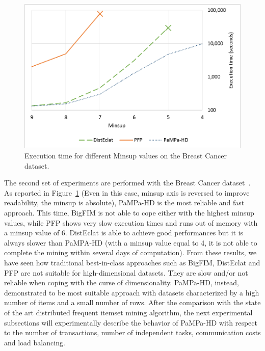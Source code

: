 \begin{figure}[!t]
\includegraphics[width=5in]{immagini_extension/breast_confronto.png}
\caption{Execution time for different Minsup values on the Breast Cancer dataset.}
\label{breast_confronto}
\end{figure}
The second set of experiments are performed with the Breast
Cancer dataset~\cite{breast_cancer_dataset}.
As reported in Figure~\ref{breast_confronto} (Even in this case, minsup axis is reversed to improve readability, the minsup is absolute), PaMPa-HD is the most reliable and fast approach.
This time, BigFIM is not able to cope either with the highest minsup values, while PFP shows very slow execution times and runs out of memory with a minsup value of 6.
DistEclat is able to achieve good performances but it is always slower than PaMPA-HD (with a minsup value equal to 4, it is not able to complete the mining within several days of computation).
From these results, we have seen how  traditional best-in-class approaches such as BigFIM, DistEclat and PFP are not suitable for high-dimensional datasets. They are slow and/or not reliable when coping with the curse of dimensionality. PaMPa-HD, instead, demonstrated to be most suitable approach with datasets characterized by a high number of items and a small number of rows.
After the comparison with the state of the art distributed frequent itemset mining algorithm, the next experimental subsections will experimentally describe the behavior of PaMPa-HD with respect to the number of transactions, number of independent tasks, communication costs and load balancing.

